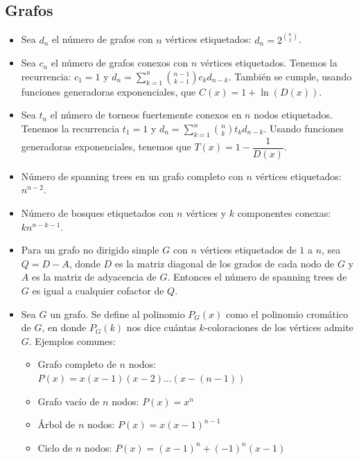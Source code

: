 	\subsection{Grafos}
		\begin{itemize}
			\item Sea $d_n$ el número de grafos con $n$ vértices etiquetados: $\displaystyle d_n = 2^{\binom{n}{2}}$.
			\item Sea $c_n$ el número de grafos conexos con $n$ vértices etiquetados. Tenemos la recurrencia: $c_1=1$ y $\displaystyle d_n = \sum_{k=1}^{n} \binom{n-1}{k-1} c_k d_{n-k}$. También se cumple, usando funciones generadoras exponenciales, que $C(x)=1+\ln(D(x))$.
			\item Sea $t_n$ el número de torneos fuertemente conexos en $n$ nodos etiquetados. Tenemos la recurrencia $t_1=1$ y $\displaystyle d_n = \sum_{k=1}^{n} \binom{n}{k} t_k d_{n-k}$. Usando funciones generadoras exponenciales, tenemos que $T(x)=1-\dfrac{1}{D(x)}$.
			\item Número de spanning trees en un grafo completo con $n$ vértices etiquetados: $n^{n-2}$.
			\item Número de bosques etiquetados con $n$ vértices y $k$ componentes conexas: $kn^{n-k-1}$.
			\item Para un grafo no dirigido simple $G$ con $n$ vértices etiquetados de $1$ a $n$, sea $Q=D-A$, donde $D$ es la matriz diagonal de los grados de cada nodo de $G$ y $A$ es la matriz de adyacencia de $G$. Entonces el número de spanning trees de $G$ es igual a cualquier cofactor de $Q$.
			\item Sea $G$ un grafo. Se define al polinomio $P_G(x)$ como el polinomio cromático de $G$, en donde $P_G(k)$ nos dice cuántas $k$-coloraciones de los vértices admite $G$. Ejemplos comunes:
			\begin{itemize}
				\item Grafo completo de $n$ nodos: $P(x)=x(x-1)(x-2) \ldots (x-(n-1))$
				\item Grafo vacío de $n$ nodos: $P(x)=x^n$
				\item Árbol de $n$ nodos: $P(x)=x(x-1)^{n-1}$
				\item Ciclo de $n$ nodos: $P(x)=(x-1)^n + (-1)^n(x-1)$
			\end{itemize}
		\end{itemize}
	
